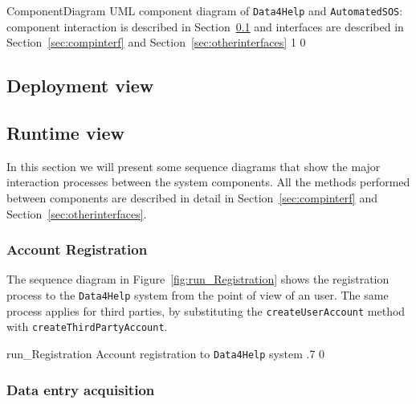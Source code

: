 \documentclass[../DD0.tex]{subfiles}
\begin{document}
        \fetchUML
          {ComponentDiagram}
          {UML component diagram of \texttt{Data4Help} and \texttt{AutomatedSOS}: component interaction is described in Section~\ref{sec:deplview} and interfaces are described in Section~\ref{sec:compinterf} and Section~\ref{sec:otherinterfaces}}
          {1}           %
          {0}           %

  \clearpage
  \subsection{Deployment view}
  \label{sec:deplview}


  \clearpage
  \subsection{Runtime view}
  \label{sec:runtview}

    In this section we will present some sequence diagrams that show the major interaction processes between the system components. All the methods performed between components are described in detail in Section~\ref{sec:compinterf} and Section~\ref{sec:otherinterfaces}.


    \subsubsection{Account Registration}
    \label{sec:runregistration}

      The sequence diagram in Figure~\ref{fig:run_Registration} shows the registration process to the \texttt{Data4Help} system from the point of view of an user. The same process applies for third parties, by substituting the \texttt{createUserAccount} method with \texttt{createThirdPartyAccount}.

      \fetchUML
        {run_Registration}
        {Account registration to \texttt{Data4Help} system}
        {.7}           %
        {0}           %

    \clearpage
    \subsubsection{Data entry acquisition}
    \label{sec:userdata}
\end{document}
